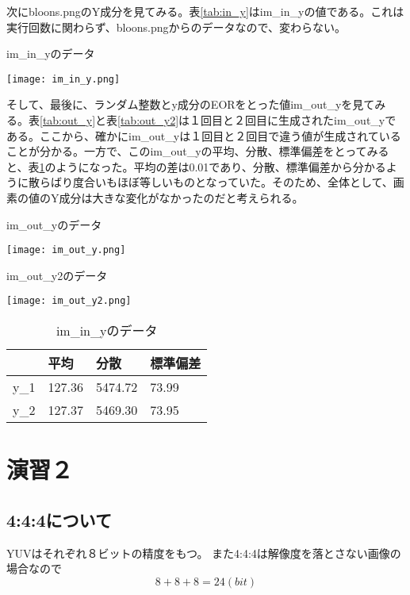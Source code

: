 \documentclass[a4j]{jsarticle}
\begin{document}
次にbloons.pngのY成分を見てみる。表\ref{tab:in_y}はim\_in\_yの値である。これは実行回数に関わらず、bloons.pngからのデータなので、変わらない。
\begin{table}
  \centering
  \caption{im\_in\_yのデータ}
  \label{tab:in_y}
    \texttt{[image: im\_in\_y.png]}
\end{table}

そして、最後に、ランダム整数とy成分のEORをとった値im\_out\_yを見てみる。表\ref{tab:out_y}と表\ref{tab:out_y2}は１回目と２回目に生成されたim\_out\_yである。ここから、確かにim\_out\_yは１回目と２回目で違う値が生成されていることが分かる。一方で、このim\_out\_yの平均、分散、標準偏差をとってみると、表\ref{tab:data_im}のようになった。平均の差は0.01であり、分散、標準偏差から分かるように散らばり度合いもほぼ等しいものとなっていた。そのため、全体として、画素の値のY成分は大きな変化がなかったのだと考えられる。

\begin{table}
  \centering
  \caption{im\_out\_yのデータ}
  \label{tab:out_y}
    \texttt{[image: im\_out\_y.png]}
\end{table}

\begin{table}
  \centering
  \caption{im\_out\_y2のデータ}
  \label{tab:out_y2}
    \texttt{[image: im\_out\_y2.png]}
\end{table}

\begin{table}
  \centering
  \caption{im\_in\_yのデータ}
  \label{tab:data_im}
  \begin{tabular}{|l|l|l|l|}
    \hline
    &平均&分散&標準偏差 \\ \hline
    y\_1&127.36&5474.72&73.99 \\ \hline
    y\_2&127.37&5469.30&73.95 \\ \hline

  \end{tabular}
\end{table}


\section{演習２}
\subsection{4:4:4について}
YUVはそれぞれ８ビットの精度をもつ。
また4:4:4は解像度を落とさない画像の場合なので
\begin{equation*}
  8+8+8=24 (bit)
\end{equation*}
\end{document}
